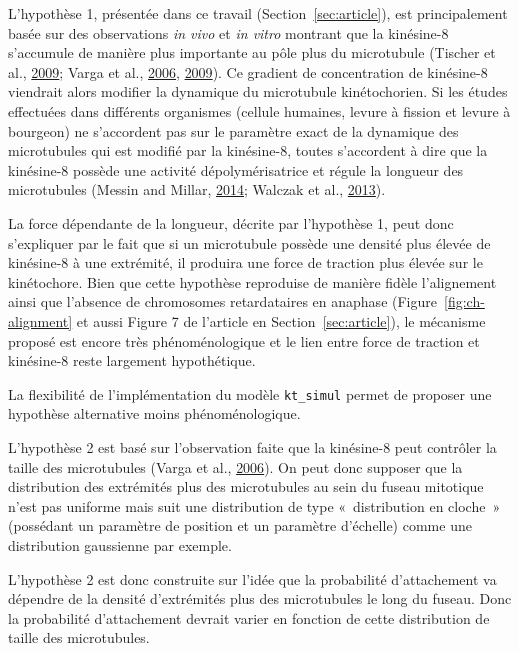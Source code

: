 \documentclass[12pt,a4paper,twoside,openright]{book}
\begin{document}
L'hypothèse 1, présentée dans ce travail (Section~\ref{sec:article}),
est principalement basée sur des observations \emph{in vivo} et \emph{in
vitro} montrant que la kinésine-8 s'accumule de manière plus importante
au pôle plus du microtubule (Tischer et al.,
\protect\hyperlink{ref-Tischer2009}{2009}; Varga et al.,
\protect\hyperlink{ref-Varga2006}{2006},
\protect\hyperlink{ref-Varga2009}{2009}). Ce gradient de concentration
de kinésine-8 viendrait alors modifier la dynamique du microtubule
kinétochorien. Si les études effectuées dans différents organismes
(cellule humaines, levure à fission et levure à bourgeon) ne s'accordent
pas sur le paramètre exact de la dynamique des microtubules qui est
modifié par la kinésine-8, toutes s'accordent à dire que la kinésine-8
possède une activité dépolymérisatrice et régule la longueur des
microtubules (Messin and Millar,
\protect\hyperlink{ref-Messin2014}{2014}; Walczak et al.,
\protect\hyperlink{ref-Walczak2013a}{2013}).

La force dépendante de la longueur, décrite par l'hypothèse 1, peut donc
s'expliquer par le fait que si un microtubule possède une densité plus
élevée de kinésine-8 à une extrémité, il produira une force de traction
plus élevée sur le kinétochore. Bien que cette hypothèse reproduise de
manière fidèle l'alignement ainsi que l'absence de chromosomes
retardataires en anaphase (Figure~\ref{fig:ch-alignment} et aussi Figure
7 de l'article en Section~\ref{sec:article}), le mécanisme proposé est
encore très phénoménologique et le lien entre force de traction et
kinésine-8 reste largement hypothétique.

La flexibilité de l'implémentation du modèle \texttt{kt\_simul} permet
de proposer une hypothèse alternative moins phénoménologique.

L'hypothèse 2 est basé sur l'observation faite que la kinésine-8 peut
contrôler la taille des microtubules (Varga et al.,
\protect\hyperlink{ref-Varga2006}{2006}). On peut donc supposer que la
distribution des extrémités plus des microtubules au sein du fuseau
mitotique n'est pas uniforme mais suit une distribution de type
«~distribution en cloche~» (possédant un paramètre de position et un
paramètre d'échelle) comme une distribution gaussienne par exemple.

L'hypothèse 2 est donc construite sur l'idée que la probabilité
d'attachement va dépendre de la densité d'extrémités plus des
microtubules le long du fuseau. Donc la probabilité d'attachement
devrait varier en fonction de cette distribution de taille des
microtubules.
\end{document}
